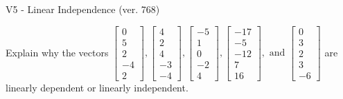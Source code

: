 \begin{exercise}
  \begin{exerciseTitle}V5 - Linear Independence (ver. 768)\end{exerciseTitle}
  \begin{exerciseStatement}
    Explain why the vectors \(\left[\begin{array}{r}
0 \\
5 \\
2 \\
-4 \\
2
\end{array}\right] , \left[\begin{array}{r}
4 \\
2 \\
4 \\
-3 \\
-4
\end{array}\right] , \left[\begin{array}{r}
-5 \\
1 \\
0 \\
-2 \\
4
\end{array}\right] , \left[\begin{array}{r}
-17 \\
-5 \\
-12 \\
7 \\
16
\end{array}\right] , \text{ and } \left[\begin{array}{r}
0 \\
3 \\
2 \\
3 \\
-6
\end{array}\right]\) are linearly dependent or linearly independent.	



\end{exerciseStatement}
\end{exercise}
